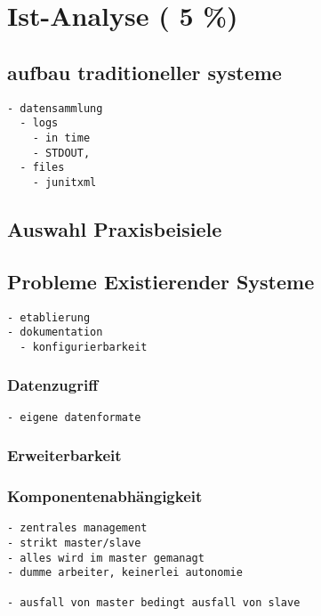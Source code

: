 \chapter{Ist-Analyse ( 5 \%)}
\label{chap:ist-analyse}


\section{aufbau traditioneller systeme}

\begin{verbatim}
- datensammlung
  - logs
    - in time
    - STDOUT,
  - files
    - junitxml
\end{verbatim}



\section{Auswahl Praxisbeisiele}

\section{Probleme Existierender Systeme}

\begin{verbatim}
- etablierung
- dokumentation
  - konfigurierbarkeit
\end{verbatim}

\subsection{Datenzugriff}
\begin{verbatim}
- eigene datenformate
\end{verbatim}
\subsection{Erweiterbarkeit}

\subsection{Komponentenabh\"angigkeit}
\begin{verbatim}
- zentrales management
- strikt master/slave
- alles wird im master gemanagt
- dumme arbeiter, keinerlei autonomie

- ausfall von master bedingt ausfall von slave


\end{verbatim}

